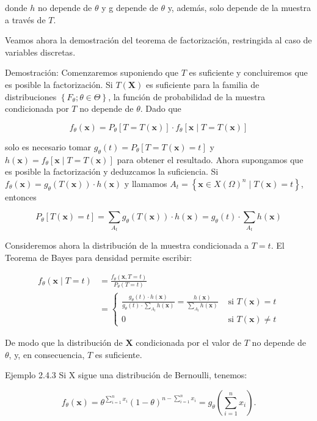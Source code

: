 \documentclass[
]{article}
\begin{document}
donde \(h\) no depende de \(\theta\) y g depende de \(\theta\) y, además, solo depende de la muestra a través de \(T\).

Veamos ahora la demostración del teorema de factorización, restringida al caso de variables discretas.

Demostración:
Comenzaremos suponiendo que \(T\) es suficiente y concluiremos que es posible la factorización.
Si \(T(\mathbf{X})\) es suficiente para la familia de distribuciones \(\left\{F_{\theta} ; \theta \in \Theta\right\}\), la función de probabilidad de la muestra condicionada por \(T\) no depende de \(\theta\). Dado que

\[
f_{\theta}(\mathbf{x})=P_{\theta}[T=T(\mathbf{x})] \cdot f_{\theta}[\mathbf{x} \mid T=T(\mathbf{x})]
\]

solo es necesario tomar \(g_{\theta}(t)=P_{\theta}[T=T(\mathbf{x})=t]\) y \(h(\mathbf{x})=f_{\theta}[\mathbf{x} \mid T=T(\mathbf{x})]\) para obtener el resultado.
Ahora supongamos que es posible la factorización y deduzcamos la suficiencia.
Si \(f_{\theta}(\mathbf{x})=g_{\theta}(T(\mathbf{x})) \cdot h(\mathbf{x})\) y llamamos \(A_{t}=\left\{\mathbf{x} \in X(\Omega)^{n} \mid T(\mathbf{x})=t\right\}\), entonces

\[
P_{\theta}[T(\mathbf{x})=t]=\sum_{A_{t}} g_{\theta}(T(\mathbf{x})) \cdot h(\mathbf{x})=g_{\theta}(t) \cdot \sum_{A_{t}} h(\mathbf{x})
\]

Consideremos ahora la distribución de la muestra condicionada a \(T=t\). El Teorema de Bayes para densidad permite escribir:

\[
\begin{aligned}
f_{\theta}(\mathbf{x} \mid T=t) & =\frac{f_{\theta}(\mathbf{x}, T=t)}{P_{\theta}(T=t)} \\
& = \begin{cases}\frac{g_{\theta}(t) \cdot h(\mathbf{x})}{g_{\theta}(t) \cdot \sum_{A_{t}} h(\mathbf{x})}=\frac{h(\mathbf{x})}{\sum_{A_{t}} h(\mathbf{x})} & \text { si } T(\mathbf{x})=t \\
0 & \text { si } T(\mathbf{x}) \neq t\end{cases}
\end{aligned}
\]

De modo que la distribución de \(\mathbf{X}\) condicionada por el valor de \(T\) no depende de \(\theta\), y, en consecuencia, \(T\) es suficiente.

Ejemplo 2.4.3 Si X sigue una distribución de Bernoulli, tenemos:

\[
f_{\theta}(\mathbf{x})=\theta^{\sum_{i=1}^{n} x_{i}}(1-\theta)^{n-\sum_{i=1}^{n} x_{i}}=g_{\theta}\left(\sum_{i=1}^{n} x_{i}\right) .
\]
\end{document}
